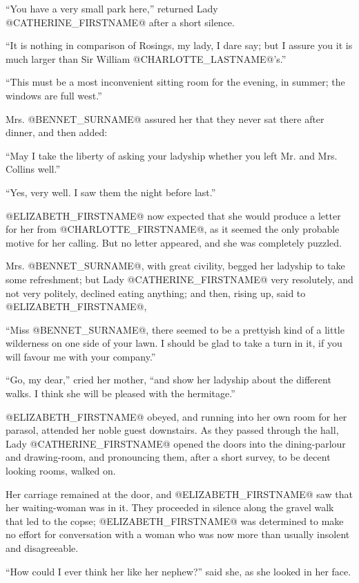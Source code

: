 ``You have a very small park here,'' returned Lady @CATHERINE_FIRSTNAME@ after a short
silence.

``It is nothing in comparison of Rosings, my lady, I dare say; but I
assure you it is much larger than Sir William @CHARLOTTE_LASTNAME@'s.''

``This must be a most inconvenient sitting room for the evening, in
summer; the windows are full west.''

Mrs. @BENNET_SURNAME@ assured her that they never sat there after dinner, and then
added:

``May I take the liberty of asking your ladyship whether you left Mr. and
Mrs. Collins well.''

``Yes, very well. I saw them the night before last.''

@ELIZABETH_FIRSTNAME@ now expected that she would produce a letter for her from
@CHARLOTTE_FIRSTNAME@, as it seemed the only probable motive for her calling. But no
letter appeared, and she was completely puzzled.

Mrs. @BENNET_SURNAME@, with great civility, begged her ladyship to take some
refreshment; but Lady @CATHERINE_FIRSTNAME@ very resolutely, and not very politely,
declined eating anything; and then, rising up, said to @ELIZABETH_FIRSTNAME@,

``Miss @BENNET_SURNAME@, there seemed to be a prettyish kind of a little wilderness
on one side of your lawn. I should be glad to take a turn in it, if you
will favour me with your company.''

``Go, my dear,'' cried her mother, ``and show her ladyship about the
different walks. I think she will be pleased with the hermitage.''

@ELIZABETH_FIRSTNAME@ obeyed, and running into her own room for her parasol,
attended her noble guest downstairs. As they passed through the
hall, Lady @CATHERINE_FIRSTNAME@ opened the doors into the dining-parlour and
drawing-room, and pronouncing them, after a short survey, to be decent
looking rooms, walked on.

Her carriage remained at the door, and @ELIZABETH_FIRSTNAME@ saw that her
waiting-woman was in it. They proceeded in silence along the gravel walk
that led to the copse; @ELIZABETH_FIRSTNAME@ was determined to make no effort for
conversation with a woman who was now more than usually insolent and
disagreeable.

``How could I ever think her like her nephew?'' said she, as she looked in
her face.

